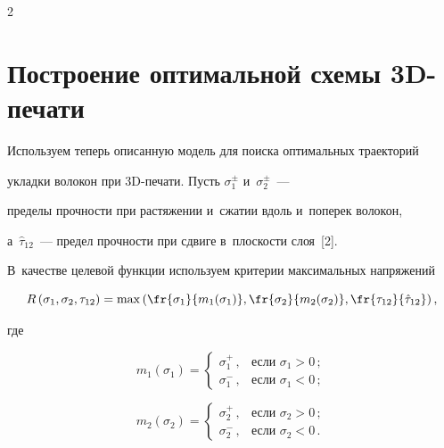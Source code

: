 \begin{multicols}{2}
\begin{figure}[b]


\end{figure}





\section{Построение оптимальной схемы 3D-печати}





  Используем теперь описанную модель для поиска оптимальных траекторий 


уклад\-ки волокон при 3D-пе\-ча\-ти. Пусть $\sigma_1^{\pm}$ и~$\sigma_2^{\pm}$~--- 


пределы проч\-ности при растяжении и~сжатии вдоль и~поперек волокон, 


а~$\hat{\tau}_{12}$~--- предел проч\-ности при сдвиге в~плос\-кости слоя~[2]. 


В~качестве целевой функции используем критерии максимальных на\-пря\-же\-ний 


$$


R\left(\sigma_1, \sigma_2, \tau_{12}\right)= \max\left( \fr{\sigma_1}{m_1(\sigma_1)}, 


\fr{\sigma_2}{m_2(\sigma_2)}, \fr{\tau_{12}}{\hat{\tau}_{12}}\right),


$$ 


где


  $$


  m_1(\sigma_1) =\begin{cases}


  \sigma_1^+\,, &\mbox{если }\sigma_1>0\,;\\


  \sigma_1^-\,, &\mbox{если }\sigma_1<0\,;


  \end{cases}


  $$


  $$


  m_2(\sigma_2) =\begin{cases}


  \sigma_2^+\,, &\mbox{если }\sigma_2>0\,;\\


  \sigma_2^-\,, &\mbox{если }\sigma_2<0\,.


  \end{cases}


  $$



\end{multicols}

